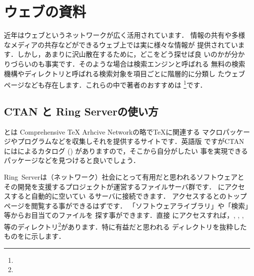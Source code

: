 \section{ウェブの資料}
近年はウェブというネットワークが広く活用されています．
情報の共有や多様なメディアの共存などができるウェブ上では実に様々な情報が
提供されています．しかし，あまりに沢山散在するために，どこをどう探せば良
いのかが分かりづらいのも事実です．そのような場合は検索エンジンと呼ばれる
無料の検索機構やディレクトリと呼ばれる検索対象を項目ごとに階層的に分類し
たウェブページなども存在します．これらの中で著者のおすすめは
\footnote{\webGoogle}です．

\subsection{CTAN と Ring Serverの使い方}

とは Comprehensive {\TeX} Arhcive Networkの略で{\TeX}に関連する
マクロパッケージやプログラムなどを収集しそれを提供するサイトです．英語版
ですがCTANにはによるカタログ 
() がありますので，そこから自分がしたい
事を実現できるパッケージなどを見つけると良いでしょう．


Ring~Serverは（ネットワーク）社会にとって有用だと思われるソフトウェアと
その開発を支援するプロジェクトが運営するファイルサーバ群です．
\webRingServer にアクセスすると自動的に空いてい
るサーバに接続できます．
アクセスするとのトップページを閲覧する事ができるはずです．
「ソフトウェアライブラリ」や「検索」等からお目当てのファイルを
探す事ができます．直接 \webRingPub にアクセスすれば，,
, , 
等のディレクトリ\footnote{\webRingText}があります．特に有益だと思われる
ディレクトリを抜粋したものをに示します．

